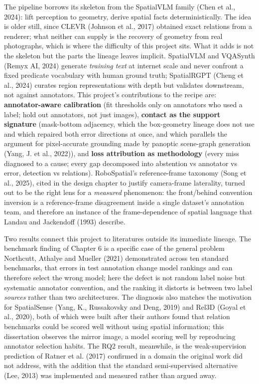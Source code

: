 The pipeline borrows its skeleton from the SpatialVLM family (Chen et al., 2024): lift perception to geometry, derive spatial facts deterministically. The idea is older still, since CLEVR (Johnson et al., 2017) obtained exact relations from a renderer; what neither can supply is the recovery of geometry from real photographs, which is where the difficulty of this project sits. What it adds is not the skeleton but the parts the lineage leaves implicit. SpatialVLM and VQASynth (Remyx AI, 2024) generate \textit{training text} at internet scale and never confront a fixed predicate vocabulary with human ground truth; SpatialRGPT (Cheng et al., 2024) curates region representations with depth but validates downstream, not against annotators. This project's contributions to the recipe are: \textbf{annotator-aware calibration} (fit thresholds only on annotators who used a label; hold out annotators, not just images), \textbf{contact as the support signature} (mask-bottom adjacency, which the box-geometry lineage does not use and which repaired both error directions at once, and which parallels the argument for pixel-accurate grounding made by panoptic scene-graph generation (Yang, J. et al., 2022)), and \textbf{loss attribution as methodology} (every miss diagnosed to a cause; every gap decomposed into abstention vs annotator vs error, detection vs relations). RoboSpatial's reference-frame taxonomy (Song et al., 2025), cited in the design chapter to justify camera-frame laterality, turned out to be the right lens for a \textit{measured} phenomenon: the front/behind convention inversion is a reference-frame disagreement inside a single dataset's annotation team, and therefore an instance of the frame-dependence of spatial language that Landau and Jackendoff (1993) describe.

Two results connect this project to literatures outside its immediate lineage. The benchmark finding of Chapter 6 is a specific case of the general problem Northcutt, Athalye and Mueller (2021) demonstrated across ten standard benchmarks, that errors in test annotation change model rankings and can therefore select the wrong model; here the defect is not random label noise but systematic annotator convention, and the ranking it distorts is between two label \textit{sources} rather than two architectures. The diagnosis also matches the motivation for SpatialSense (Yang, K., Russakovsky and Deng, 2019) and Rel3D (Goyal et al., 2020), both of which were built after their authors found that relation benchmarks could be scored well without using spatial information; this dissertation observes the mirror image, a model scoring well by reproducing annotator selection habits. The RQ2 result, meanwhile, is the weak-supervision prediction of Ratner et al. (2017) confirmed in a domain the original work did not address, with the addition that the standard semi-supervised alternative (Lee, 2013) was implemented and measured rather than argued away.

